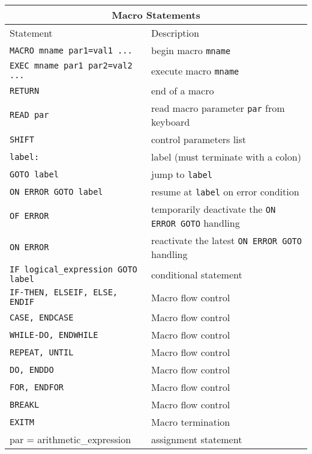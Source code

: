 \begin{center}
\begin{tabular}{|l|l|} \hline
\multicolumn{2}{|c|}{\bf Macro Statements} \\ \hline
{\sc Statement}                         & {\sc Description} \\
\hline
{\tt MACRO mname par1=val1 ...}         & begin macro {\tt mname} \\
{\tt EXEC mname par1 par2=val2 ...}     & execute macro {\tt mname} \\
{\tt RETURN}                            & end of a macro \\
{\tt READ par}                 & read macro parameter {\tt par} from keyboard \\
{\tt SHIFT}                             & control parameters list \\
{\tt label:}                            & label (must terminate with a colon) \\
{\tt GOTO label}                        & jump to {\tt label} \\
{\tt ON ERROR GOTO label}  & resume at {\tt label} on error condition \\
{\tt OF ERROR}    & temporarily deactivate the {\tt ON ERROR GOTO} handling   \\
{\tt ON ERROR}    & reactivate the latest {\tt ON ERROR GOTO} handling        \\
{\tt IF logical\_expression GOTO label} & conditional statement \\
{\tt IF-THEN, ELSEIF, ELSE, ENDIF}      & Macro flow control    \\
{\tt CASE, ENDCASE}                     & Macro flow control    \\
{\tt WHILE-DO, ENDWHILE}                & Macro flow control    \\
{\tt REPEAT, UNTIL}                     & Macro flow control    \\
{\tt DO, ENDDO}                         & Macro flow control    \\
{\tt FOR, ENDFOR}                       & Macro flow control    \\
{\tt BREAKL}                            & Macro flow control    \\
{\tt EXITM}                             & Macro termination     \\
par = arithmetic\_expression            & assignment statement  \\
\hline
\end{tabular}
\end{center}

